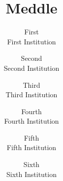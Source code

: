 \documentclass[letterpaper,twocolumn,10pt]{article}
\begin{document}
\date{}

\title{\Large \bf Meddle}

\author{
{\rm First}\\
First Institution
\and
{\rm Second}\\
Second Institution
\and
{\rm Third}\\
Third Institution
\and
{\rm Fourth}\\
Fourth Institution
\and
{\rm Fifth}\\
Fifth Institution
\and
{\rm Sixth}\\
Sixth Institution
} 

\maketitle

\thispagestyle{empty}





{\footnotesize 
}

\end{document}

